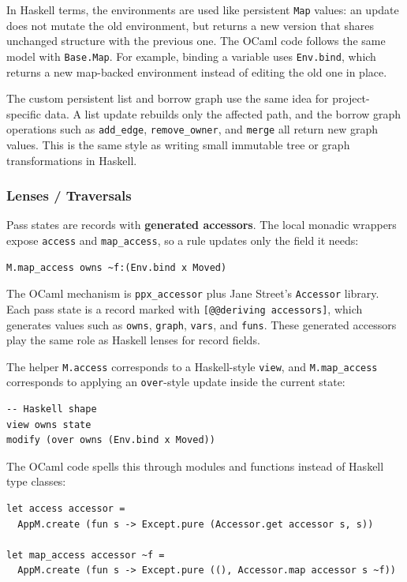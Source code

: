 \documentclass[a4paper]{article}
\begin{document}
In Haskell terms, the environments are used like persistent \texttt{Map} values:
an update does not mutate the old environment, but returns a new version that
shares unchanged structure with the previous one. The OCaml code follows the
same model with \texttt{Base.Map}. For example, binding a variable uses
\texttt{Env.bind}, which returns a new map-backed environment instead of editing
the old one in place.

The custom persistent list and borrow graph use the same idea for project-specific
data. A list update rebuilds only the affected path, and the borrow graph
operations such as \texttt{add\_edge}, \texttt{remove\_owner}, and
\texttt{merge} all return new graph values. This is the same style as writing
small immutable tree or graph transformations in Haskell.

\subsubsection{Lenses / Traversals}

Pass states are records with \textbf{generated accessors}. The local monadic
wrappers expose \texttt{access} and \texttt{map\_access}, so a rule updates
only the field it needs:

\begin{lstlisting}
M.map_access owns ~f:(Env.bind x Moved)
\end{lstlisting}

The OCaml mechanism is \texttt{ppx\_accessor} plus Jane Street's
\texttt{Accessor} library. Each pass state is a record marked with
\texttt{[@@deriving accessors]}, which generates values such as \texttt{owns},
\texttt{graph}, \texttt{vars}, and \texttt{funs}. These generated accessors play
the same role as Haskell lenses for record fields.

The helper \texttt{M.access} corresponds to a Haskell-style \texttt{view}, and
\texttt{M.map\_access} corresponds to applying an \texttt{over}-style update
inside the current state:

\begin{lstlisting}
-- Haskell shape
view owns state
modify (over owns (Env.bind x Moved))
\end{lstlisting}

The OCaml code spells this through modules and functions instead of Haskell type
classes:

\begin{lstlisting}
let access accessor =
  AppM.create (fun s -> Except.pure (Accessor.get accessor s, s))

let map_access accessor ~f =
  AppM.create (fun s -> Except.pure ((), Accessor.map accessor s ~f))
\end{lstlisting}
\end{document}
